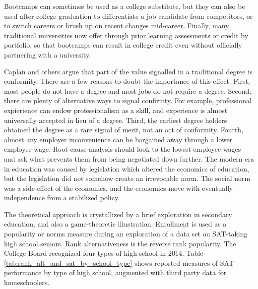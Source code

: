 \documentclass[AER]{./aea-latex-templates/AEA}
\begin{document}
        Bootcamps can sometimes be used as a college substitute, but they can also
        be used after college graduation to differentiate a job candidate from
        competitors, or to switch careers or brush up on recent changes
        mid-career. Finally, many traditional universities now offer through prior
        learning assessments or credit by portfolio, so that bootcamps can result
        in college credit even without officially partnering with a university\cite{aceposttraditionallearners}.
        
        Caplan and others argue that part of the value signalled in a traditional degree is conformity. There
        are a few reasons to doubt the importance of this effect. First, most people do not have a degree and most jobs
        do not require a degree. Second, there are plenty of alternative ways to signal confirmty. For example, professional expierience
        can endow professionalism as a skill, and experience is almost universally accepted in lieu of a degree.
        Third, the earliest degree holders obtained the degree as a rare signal of merit, not an act of
        conformity. Fourth, almost any employer inconvenience can be bargained away through a lower employee
        wage. Root cause analysis should look to the lowest employee wages and ask what prevents them from
        being negotiated down further. The modern era in education was caused by legislation which altered the economics of education,
        but the legislation did not somehow create an irrevocable norm. The social norm was a side-effect of the economics, and the economics
        move with eventually independence from a stabilized policy.
        
        The theoretical approach is crystallized by a brief exploration in
        secondary education, and also a game-theoretic illustration. Enrollment is used as
        a popularity or norms measure during an exploration of a data set on SAT-taking
        high school seniors. Rank alternativeness is the reverse rank popularity. The College Board recognized four types of high
        school in 2014\cite{collegeboard_2014}. Table \ref{tab:rank_alt_and_sat_by_school_type} shows reported measures of SAT performance by type of
        high school, augmented with third party data for homeschoolers\cite{mullins_2016}.
        
\end{document}
